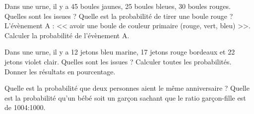 \documentclass[../Cours.tex]{subfiles}
\begin{document}
\begin{questions}
    \exercice Dans une urne, il y a 45 boules jaunes, 25 boules bleues, 30 boules rouges.
    \question Quelles sont les issues ?
    \question Quelle est la probabilité de tirer une boule rouge ?
    \question L'évènement A : << avoir une boule de couleur primaire (rouge, vert, bleu) >>. Calculer la probabilité de l'évènement A.

    \exercice Dans une urne, il y a 12 jetons bleu marine, 17 jetons rouge bordeaux et 22 jetons violet clair.
    \question Quelles sont les issues ?
    \question Calculer toutes les probabilités. Donner les résultats en pourcentage.

    \exercice
    \question Quelle est la probabilité que deux personnes aient le même anniversaire ?
    \question Quelle est la probabilité qu'un bébé soit un garçon sachant que le ratio garçon-fille est de 1004:1000.

\end{questions}
\end{document}
